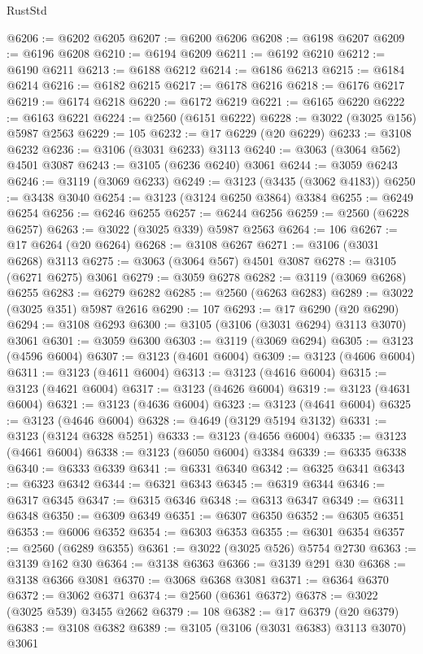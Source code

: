 \begin{lexlean}{RustStd}
\begin{coremodule}
@6206 := @6202 @6205
@6207 := @6200 @6206
@6208 := @6198 @6207
@6209 := @6196 @6208
@6210 := @6194 @6209
@6211 := @6192 @6210
@6212 := @6190 @6211
@6213 := @6188 @6212
@6214 := @6186 @6213
@6215 := @6184 @6214
@6216 := @6182 @6215
@6217 := @6178 @6216
@6218 := @6176 @6217
@6219 := @6174 @6218
@6220 := @6172 @6219
@6221 := @6165 @6220
@6222 := @6163 @6221
@6224 := @2560 (@6151 @6222)
@6228 := @3022 (@3025 @156) @5987 @2563
@6229 := 105
@6232 := @17 @6229 (@20 @6229)
@6233 := @3108 @6232
@6236 := @3106 (@3031 @6233) @3113
@6240 := @3063 (@3064 @562) @4501 @3087
@6243 := @3105 (@6236 @6240) @3061
@6244 := @3059 @6243
@6246 := @3119 (@3069 @6233)
@6249 := @3123 (@3435 (@3062 @4183))
@6250 := @3438 @3040
@6254 := @3123 (@3124 @6250 @3864) @3384
@6255 := @6249 @6254
@6256 := @6246 @6255
@6257 := @6244 @6256
@6259 := @2560 (@6228 @6257)
@6263 := @3022 (@3025 @339) @5987 @2563
@6264 := 106
@6267 := @17 @6264 (@20 @6264)
@6268 := @3108 @6267
@6271 := @3106 (@3031 @6268) @3113
@6275 := @3063 (@3064 @567) @4501 @3087
@6278 := @3105 (@6271 @6275) @3061
@6279 := @3059 @6278
@6282 := @3119 (@3069 @6268) @6255
@6283 := @6279 @6282
@6285 := @2560 (@6263 @6283)
@6289 := @3022 (@3025 @351) @5987 @2616
@6290 := 107
@6293 := @17 @6290 (@20 @6290)
@6294 := @3108 @6293
@6300 := @3105 (@3106 (@3031 @6294) @3113 @3070) @3061
@6301 := @3059 @6300
@6303 := @3119 (@3069 @6294)
@6305 := @3123 (@4596 @6004)
@6307 := @3123 (@4601 @6004)
@6309 := @3123 (@4606 @6004)
@6311 := @3123 (@4611 @6004)
@6313 := @3123 (@4616 @6004)
@6315 := @3123 (@4621 @6004)
@6317 := @3123 (@4626 @6004)
@6319 := @3123 (@4631 @6004)
@6321 := @3123 (@4636 @6004)
@6323 := @3123 (@4641 @6004)
@6325 := @3123 (@4646 @6004)
@6328 := @4649 (@3129 @5194 @3132)
@6331 := @3123 (@3124 @6328 @5251)
@6333 := @3123 (@4656 @6004)
@6335 := @3123 (@4661 @6004)
@6338 := @3123 (@6050 @6004) @3384
@6339 := @6335 @6338
@6340 := @6333 @6339
@6341 := @6331 @6340
@6342 := @6325 @6341
@6343 := @6323 @6342
@6344 := @6321 @6343
@6345 := @6319 @6344
@6346 := @6317 @6345
@6347 := @6315 @6346
@6348 := @6313 @6347
@6349 := @6311 @6348
@6350 := @6309 @6349
@6351 := @6307 @6350
@6352 := @6305 @6351
@6353 := @6006 @6352
@6354 := @6303 @6353
@6355 := @6301 @6354
@6357 := @2560 (@6289 @6355)
@6361 := @3022 (@3025 @526) @5754 @2730
@6363 := @3139 @162 @30
@6364 := @3138 @6363
@6366 := @3139 @291 @30
@6368 := @3138 @6366 @3081
@6370 := @3068 @6368 @3081
@6371 := @6364 @6370
@6372 := @3062 @6371
@6374 := @2560 (@6361 @6372)
@6378 := @3022 (@3025 @539) @3455 @2662
@6379 := 108
@6382 := @17 @6379 (@20 @6379)
@6383 := @3108 @6382
@6389 := @3105 (@3106 (@3031 @6383) @3113 @3070) @3061

\end{coremodule}
\end{lexlean}
